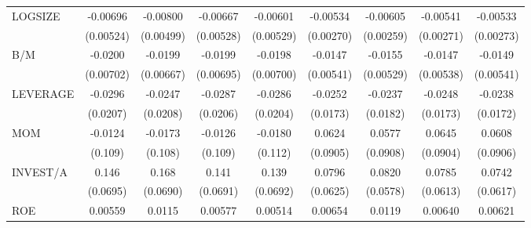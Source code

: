 {\begin{tabular}{l*{8}{c}}
LOGSIZE             &    -0.00696         &    -0.00800         &    -0.00667         &    -0.00601         &    -0.00534\sym{*}  &    -0.00605\sym{**} &    -0.00541\sym{*}  &    -0.00533\sym{*}  \\
                    &   (0.00524)         &   (0.00499)         &   (0.00528)         &   (0.00529)         &   (0.00270)         &   (0.00259)         &   (0.00271)         &   (0.00273)         \\
B/M                 &     -0.0200\sym{***}&     -0.0199\sym{***}&     -0.0199\sym{***}&     -0.0198\sym{***}&     -0.0147\sym{***}&     -0.0155\sym{***}&     -0.0147\sym{***}&     -0.0149\sym{***}\\
                    &   (0.00702)         &   (0.00667)         &   (0.00695)         &   (0.00700)         &   (0.00541)         &   (0.00529)         &   (0.00538)         &   (0.00541)         \\
LEVERAGE            &     -0.0296         &     -0.0247         &     -0.0287         &     -0.0286         &     -0.0252         &     -0.0237         &     -0.0248         &     -0.0238         \\
                    &    (0.0207)         &    (0.0208)         &    (0.0206)         &    (0.0204)         &    (0.0173)         &    (0.0182)         &    (0.0173)         &    (0.0172)         \\
MOM                 &     -0.0124         &     -0.0173         &     -0.0126         &     -0.0180         &      0.0624         &      0.0577         &      0.0645         &      0.0608         \\
                    &     (0.109)         &     (0.108)         &     (0.109)         &     (0.112)         &    (0.0905)         &    (0.0908)         &    (0.0904)         &    (0.0906)         \\
INVEST/A            &       0.146\sym{**} &       0.168\sym{**} &       0.141\sym{**} &       0.139\sym{**} &      0.0796         &      0.0820         &      0.0785         &      0.0742         \\
                    &    (0.0695)         &    (0.0690)         &    (0.0691)         &    (0.0692)         &    (0.0625)         &    (0.0578)         &    (0.0613)         &    (0.0617)         \\
ROE                 &     0.00559         &      0.0115         &     0.00577         &     0.00514         &     0.00654         &      0.0119         &     0.00640         &     0.00621         \\

\end{tabular}}
